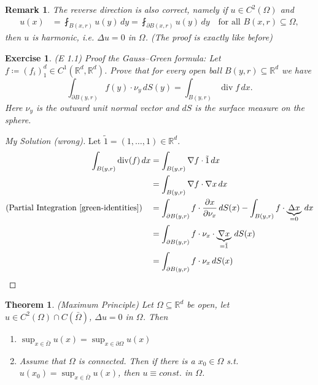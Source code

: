 \documentclass{report}
\theoremstyle{tommy}
\newtheorem{thm}[defn]{Theorem}
\newtheorem{rem}[defn]{Remark}
\newtheorem{ex}[defn]{Exercise}
\renewcommand\div{\operatorname{div}}
\begin{document}
\begin{rem}
  The reverse direction is also correct, namely if \(u \in C^2(\Omega)\) and
  \begin{align*}
    u(x) 
    &= \fint_{B(x, r)} u(y) \, dy
    = \fint_{\partial B(x,r)} u(y) \, dy
    \quad \text{for all } B(x,r) \subseteq \Omega,
  \end{align*}
  then \(u\) is harmonic, i.e. \(\Delta u = 0\) in \(\Omega\). (The proof is exactly like before)
\end{rem}

\begin{ex} (E 1.1)
  Proof the Gauss–Green formula: Let \(f \coloneqq (f_i)_1^d \in C^1(\mathbb{R}^d, \mathbb{R}^d)\). Prove that for every open ball \(B(y, r) \subseteq \mathbb{R}^d\) we have \[\int_{\partial B(y, r)} f(y) \cdot \nu_y \, dS(y) = \int_{B(y, r)}\div f \, dx.\]
  Here \(\nu_y\) is the outward unit normal vector and \(dS\) is the surface measure on the sphere.
\end{ex}

\begin{proof}[My Solution (wrong)]
  Let \(\tilde 1 = (1, \dots, 1) \in \mathbb{R}^d\).
  \begin{align*}
    \int_{B(y, r)} \div(f) \, dx 
    &= \int_{B(y, r)} \nabla f \cdot \tilde 1 \, dx \\
    &= \int_{B(y, r)} \nabla f \cdot \nabla x \, dx \\
    \text{(Partial Integration~\ref{green-identities})} \quad &= \int_{\partial B(y, r)} f \cdot \frac{\partial x}{\partial \nu_x} \, dS(x) - \int_{B(y, r)} f \cdot \underbrace{\Delta x}_{= 0} \, dx \\
    &= \int_{\partial B(y, r)} f \cdot \nu_x \cdot \underbrace{\nabla x}_{= \tilde 1} \, dS(x) \\
    &= \int_{\partial B(y, r)} f \cdot \nu_x \, dS(x) \qedhere
  \end{align*}
\end{proof}

\begin{thm} (Maximum Principle)
  Let \(\Omega \subseteq \mathbb{R}^d\) be open, let \(u \in C^2(\Omega) \cap C(\bar \Omega)\), \(\Delta u = 0\) in \(\Omega\). Then
  \begin{enumerate}
    \item \(\sup_{x \in \bar \Omega} u(x) = \sup_{x \in \partial \Omega} u(x)\)
    \item Assume that \(\Omega\) is connected. Then if there is a \(x_0 \in \Omega\) s.t. \( u(x_0) = \sup_{x \in \bar \Omega} u(x)\), then \( u \equiv const.\) in \(\Omega\).
  \end{enumerate}
\end{thm}
\end{document}

